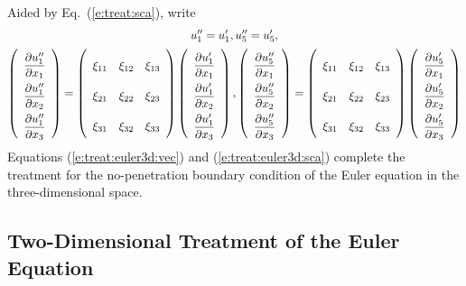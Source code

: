 \documentclass[a4paper,12pt,dvips]{article}
\begin{document}
%
Aided by Eq.~(\ref{e:treat:sca}), write
\begin{gather}
  u''_1 = u'_1, u''_5 = u'_5,
  \label{e:treat:euler3d:sca}
  \\
  \renewcommand{\arraystretch}{2.2}
  \left(\begin{array}{c}
    \dfrac{\partial u''_1}{\partial x_1} \\
    \dfrac{\partial u''_1}{\partial x_2} \\
    \dfrac{\partial u''_1}{\partial x_3}
  \end{array}\right)
  = \left(\begin{array}{ccc}
    \xi_{11} & \xi_{12} & \xi_{13} \\
    \xi_{21} & \xi_{22} & \xi_{23} \\
    \xi_{31} & \xi_{32} & \xi_{33}
  \end{array}\right)
  \left(\begin{array}{c}
    \dfrac{\partial u'_1}{\partial x_1} \\
    \dfrac{\partial u'_1}{\partial x_2} \\
    \dfrac{\partial u'_1}{\partial x_3}
  \end{array}\right),
  \left(\begin{array}{c}
    \dfrac{\partial u''_5}{\partial x_1} \\
    \dfrac{\partial u''_5}{\partial x_2} \\
    \dfrac{\partial u''_5}{\partial x_3}
  \end{array}\right)
  = \left(\begin{array}{ccc}
    \xi_{11} & \xi_{12} & \xi_{13} \\
    \xi_{21} & \xi_{22} & \xi_{23} \\
    \xi_{31} & \xi_{32} & \xi_{33}
  \end{array}\right)
  \left(\begin{array}{c}
    \dfrac{\partial u'_5}{\partial x_1} \\
    \dfrac{\partial u'_5}{\partial x_2} \\
    \dfrac{\partial u'_5}{\partial x_3}
  \end{array}\right)
  \notag
\end{gather}
%
Equations (\ref{e:treat:euler3d:vec}) and (\ref{e:treat:euler3d:sca}) complete
the treatment for the no-penetration boundary condition of the Euler equation
in the three-dimensional space.

\subsection{Two-Dimensional Treatment of the Euler Equation}
\end{document}
